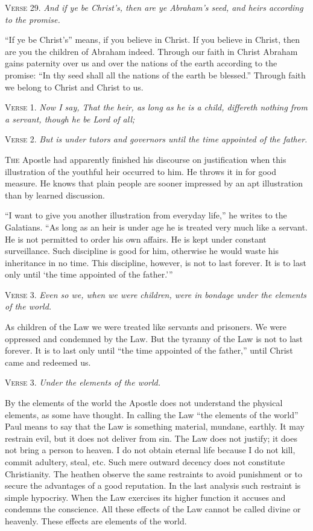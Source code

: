 \textsc{Verse} 29. \emph{And if ye be Christ’s, then are ye Abraham’s seed, and heirs according to the promise.}

“If ye be Christ’s” means, if you believe in Christ. If you believe in Christ, then are you the children of Abraham indeed. Through our faith in Christ Abraham gains paternity over us and over the nations of the earth according to the promise: “In thy seed shall all the nations of the earth be blessed.” Through faith we belong to Christ and Christ to us.


\textsc{Verse} 1. \emph{Now I say, That the heir, as long as he is a child, differeth nothing from a servant, though he be Lord of all;}

\textsc{Verse} 2. \emph{But is under tutors and governors until the time appointed of the father.}

\textsc{The} Apostle had apparently finished his discourse on justification when this illustration of the youthful heir occurred to him. He throws it in for good measure. He knows that plain people are sooner impressed by an apt illustration than by learned discussion.

“I want to give you another illustration from everyday life,” he writes to the Galatians. “As long as an heir is under age he is treated very much like a servant. He is not permitted to order his own affairs. He is kept under constant surveillance. Such discipline is good for him, otherwise he would waste his inheritance in no time. This discipline, however, is not to last forever. It is to last only until ‘the time appointed of the father.’”

\textsc{Verse} 3. \emph{Even so we, when we were children, were in bondage under the elements of the world.}

As children of the Law we were treated like servants and prisoners. We were oppressed and condemned by the Law. But the tyranny of the Law is not to last forever. It is to last only until “the time appointed of the father,” until Christ came and redeemed us.

\textsc{Verse} 3. \emph{Under the elements of the world.}

By the elements of the world the Apostle does not understand the physical elements, as some have thought. In calling the Law “the elements of the world” Paul means to say that the Law is something material, mundane, earthly. It may restrain evil, but it does not deliver from sin. The Law does not justify; it does not bring a person to heaven. I do not obtain eternal life because I do not kill, commit adultery, steal, etc. Such mere outward decency does not constitute Christianity. The heathen observe the same restraints to avoid punishment or to secure the advantages of a good reputation. In the last analysis such restraint is simple hypocrisy. When the Law exercises its higher function it accuses and condemns the conscience. All these effects of the Law cannot be called divine or heavenly. These effects are elements of the world.

